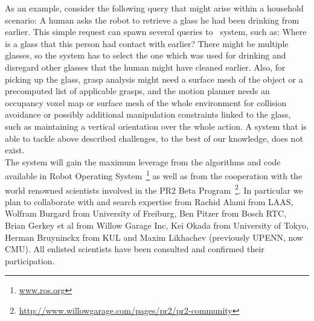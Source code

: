 As an example, consider the following query that might arise within a
household scenario: A human asks the robot to retrieve a glass he had
been drinking from earlier. This simple request can spawn several queries to
\ksem\ system, such as: Where is a glass that this person had contact with earlier?
There might be multiple glasses, so the system has to select the one
which was used for drinking and disregard other glasses that the human
might have cleaned earlier. Also, for picking up the glass, grasp
analysis might need a surface mesh of the object or a precomputed list
of applicable grasps, and the motion planner needs an occupancy voxel
map or surface mesh of the whole environment for collision avoidance or
possibly additional manipulation constraints linked to the glass, such
as maintaining a vertical orientation over the whole action.
A system that is able to tackle above described challenges, to the best of our
knowledge, does not exist.\\
The system will gain the maximum leverage from the algorithms and code available
in Robot Operating System~\footnote{\url{www.ros.org}} as well as from the cooperation
with the world renowned scientists involved in the PR2 Beta Program~\footnote{\url{http://www.willowgarage.com/pages/pr2/pr2-community}}.
In particular we plan to collaborate with and search expertise from Rachid Alami from LAAS, Wolfram Burgard
from University of Freiburg, Ben Pitzer from Bosch RTC, Brian Gerkey et al from Willow Garage Inc, 
Kei Okada from University of Tokyo, Herman  Bruyninckx from KUL and Maxim Likhachev (previously UPENN, now CMU).
All enlisted scientists have been consulted and confirmed their participation.
